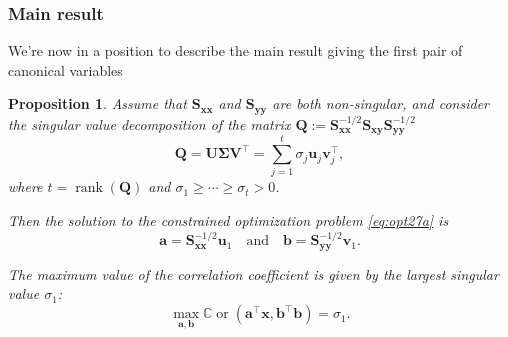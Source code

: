 \documentclass[
]{book}
\newtheorem{proposition}{Proposition}[chapter]
\theoremstyle{definition}
\theoremstyle{definition}
\theoremstyle{definition}
\theoremstyle{definition}
\theoremstyle{remark}
\begin{document}
\hypertarget{main-result}{%
\subsubsection*{Main result}\label{main-result}}

We're now in a position to describe the main result giving the first pair of canonical variables

\begin{proposition}
\protect\hypertarget{prp:unnamed-chunk-2}{}{\label{prp:unnamed-chunk-2} }
Assume that \(\mathbf S_{\mathbf x\mathbf x}\) and \(\mathbf S_{\mathbf y\mathbf y}\) are both non-singular, and consider the singular value decomposition of the matrix \(\mathbf Q:=\mathbf S_{\mathbf x\mathbf x}^{-1/2} \mathbf S_{\mathbf x\mathbf y}\mathbf S_{\mathbf y\mathbf y}^{-1/2}\)
\begin{equation}
\mathbf Q= {\mathbf U}{\pmb \Sigma} {\mathbf V}^\top = \sum_{j=1}^t \sigma_j {\mathbf u}_j {\mathbf v}_j^\top,
\label{eq:svdcca}
\end{equation}
where \(t=\operatorname{rank}(\mathbf Q)\) and \(\sigma_1 \geq \cdots \geq \sigma_t >0\).

Then the solution to the constrained optimization problem \eqref{eq:opt27a} is \[\mathbf a=\mathbf S_{\mathbf x\mathbf x}^{-1/2}{\mathbf u}_1\quad \mbox{and}\quad \mathbf b=\mathbf S_{\mathbf y\mathbf y}^{-1/2}{\mathbf v}_1.\]

The maximum value of the correlation coefficient is given by the largest singular value \(\sigma_1\):
\[\max_{\mathbf a, \mathbf b} {\mathbb{C}\operatorname{or}}(\mathbf a^\top\mathbf x, \mathbf b^\top\mathbf b)=\sigma_1.\]
\end{proposition}
\end{document}
